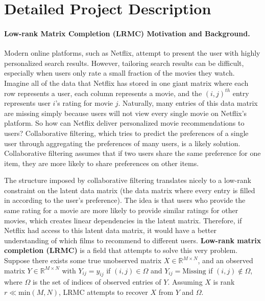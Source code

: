 \section{Detailed Project Description}
\paragraph{\textbf{Low-rank Matrix Completion (LRMC) Motivation and Background.}} Modern online platforms, such as Netflix, attempt to present the user with highly personalized search results. However, tailoring search results can be difficult, especially when users only rate a small fraction of the movies they watch. Imagine all of the data that Netflix has stored in one giant matrix where each row represents a user, each column represents a movie, and the $(i,j)^{th}$ entry represents user $i$'s rating for movie $j$. Naturally, many entries of this data matrix are missing simply because users will not view every single movie on Netflix's platform. So how can Netflix deliver personalized movie recommendations to users? Collaborative filtering, which tries to predict the preferences of a single user through aggregating the preferences of many users, is a likely solution. Collaborative filtering assumes that if two users share the same preference for one item, they are more likely to share preferences on other items.

 The structure imposed by collaborative filtering translates nicely to a low-rank constraint on the latent data matrix (the data matrix where every entry is filled in according to the user's preference). The idea is that users who provide the same rating for a movie are more likely to provide similar ratings for other movies, which creates linear dependencies in the latent matrix. Therefore, if Netflix had access to this latent data matrix, it would have a better understanding of which films to recommend to different users. \textbf{Low-rank matrix completion (LRMC)} is a field that attempts to solve this very problem. Suppose there exists some true unobserved matrix $X \in \mathbb{R}^{M \times N}$, and an observed matrix $Y \in \mathbb{R}^{M \times N}$ with $Y_{ij} = y_{ij}$ if $(i,j) \in \Omega$ and $Y_{ij} = \text{Missing}$ if $(i,j) \notin \Omega$, where $\Omega$ is the set of indices of observed entries of $Y$. Assuming $X$ is rank $r \ll \text{min}(M, N)$, LRMC attempts to recover $X$ from $Y$ and $\Omega$.

